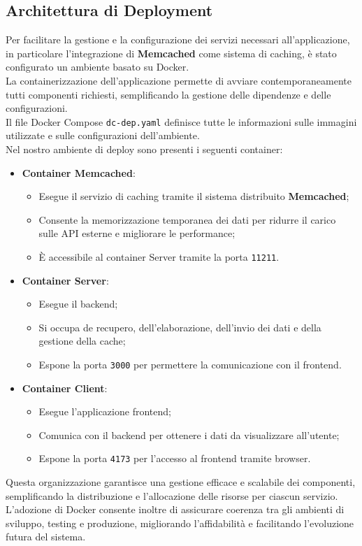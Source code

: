 \subsection{Architettura di Deployment}

Per facilitare la gestione e la configurazione dei servizi necessari all'applicazione, in particolare l'integrazione di \textbf{Memcached} come sistema di caching, è stato configurato un ambiente basato su Docker.\\
La containerizzazione dell'applicazione permette di avviare contemporaneamente tutti componenti richiesti, semplificando la gestione delle dipendenze e delle configurazioni.\\
Il file Docker Compose \texttt{dc-dep.yaml} definisce tutte le informazioni sulle immagini utilizzate e sulle configurazioni dell'ambiente.\\

Nel nostro ambiente di deploy sono presenti i seguenti container:

\begin{itemize}
    \item \textbf{Container Memcached}:
    \begin{itemize}
        \item Esegue il servizio di caching tramite il sistema distribuito \textbf{Memcached};
        \item Consente la memorizzazione temporanea dei dati per ridurre il carico sulle API esterne e migliorare le performance;
        \item È accessibile al container Server tramite la porta \texttt{11211}.
    \end{itemize}
    
    \item \textbf{Container Server}:
    \begin{itemize}
        \item Esegue il backend;
        \item Si occupa de recupero, dell'elaborazione, dell'invio dei dati e della gestione della cache;
        \item Espone la porta \texttt{3000} per permettere la comunicazione con il frontend.
    \end{itemize}
    
    \item \textbf{Container Client}:
    \begin{itemize}
        \item Esegue l'applicazione frontend;
        \item Comunica con il backend per ottenere i dati da visualizzare all'utente;
        \item Espone la porta \texttt{4173} per l'accesso al frontend tramite browser.
    \end{itemize}
\end{itemize}

Questa organizzazione garantisce una gestione efficace e scalabile dei componenti, semplificando la distribuzione e l'allocazione delle risorse per ciascun servizio. 
L'adozione di Docker consente inoltre di assicurare coerenza tra gli ambienti di sviluppo, testing e produzione, migliorando l'affidabilità e facilitando l'evoluzione futura del sistema.
